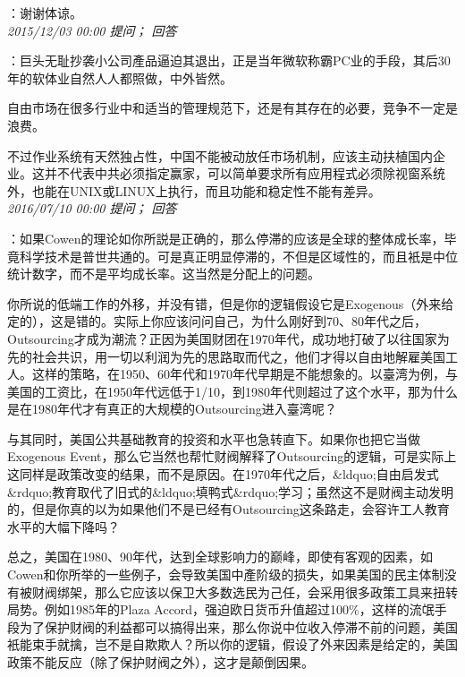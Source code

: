 \documentclass[twocolumn]{ctexart}
\begin{document}
：谢谢体谅。\\

\textit{\hfill\noindent\small 2015/12/03 00:00 提问； 回答}

：巨头无耻抄袭小公司產品逼迫其退出，正是当年微软称霸PC业的手段，其后30年的软体业自然人人都照做，中外皆然。

自由市场在很多行业中和适当的管理规范下，还是有其存在的必要，竞争不一定是浪费。

不过作业系统有天然独占性，中国不能被动放任市场机制，应该主动扶植国内企业。这并不代表中共必须指定赢家，可以简单要求所有应用程式必须除视窗系统外，也能在UNIX或LINUX上执行，而且功能和稳定性不能有差异。\\

\textit{\hfill\noindent\small 2016/07/10 00:00 提问； 回答}

：如果Cowen的理论如你所説是正确的，那么停滞的应该是全球的整体成长率，毕竟科学技术是普世共通的。可是真正明显停滞的，不但是区域性的，而且衹是中位统计数字，而不是平均成长率。这当然是分配上的问题。

你所说的低端工作的外移，并没有错，但是你的逻辑假设它是Exogenous（外来给定的），这是错的。实际上你应该问问自己，为什么刚好到70、80年代之后，Outsourcing才成为潮流？正因为美国财团在1970年代，成功地打破了以往国家为先的社会共识，用一切以利润为先的思路取而代之，他们才得以自由地解雇美国工人。这样的策略，在1950、60年代和1970年代早期是不能想象的。以臺湾为例，与美国的工资比，在1950年代远低于1/10，到1980年代则超过了这个水平，那为什么是在1980年代才有真正的大规模的Outsourcing进入臺湾呢？

与其同时，美国公共基础教育的投资和水平也急转直下。如果你也把它当做Exogenous Event，那么它当然也帮忙财阀解释了Outsourcing的逻辑，可是实际上这同样是政策改变的结果，而不是原因。在1970年代之后，\&ldquo;自由启发式\&rdquo;教育取代了旧式的\&ldquo;填鸭式\&rdquo;学习；虽然这不是财阀主动发明的，但是你真的以为如果他们不是已经有Outsourcing这条路走，会容许工人教育水平的大幅下降吗？

总之，美国在1980、90年代，达到全球影响力的巅峰，即使有客观的因素，如Cowen和你所举的一些例子，会导致美国中產阶级的损失，如果美国的民主体制没有被财阀绑架，那么它应该以保卫大多数选民为己任，会采用很多政策工具来扭转局势。例如1985年的Plaza Accord，强迫欧日货币升值超过100\%，这样的流氓手段为了保护财阀的利益都可以搞得出来，那么你说中位收入停滞不前的问题，美国衹能束手就擒，岂不是自欺欺人？所以你的逻辑，假设了外来因素是给定的，美国政策不能反应（除了保护财阀之外），这才是颠倒因果。\\
\end{document}
